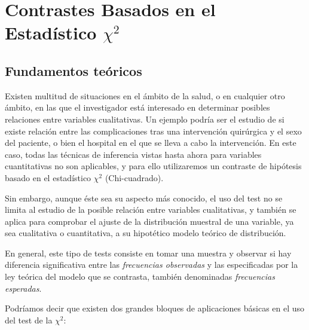
\chapter{Contrastes Basados en el Estadístico $\chi^{2}$}
\section{Fundamentos teóricos}
Existen multitud de situaciones en el ámbito de la salud, o en 
cualquier otro ámbito, en las que el investigador está interesado en determinar posibles relaciones entre variables cualitativas. Un ejemplo podría ser el estudio de si existe relación entre las complicaciones tras una intervención quirúrgica y el
 sexo del paciente, o bien el hospital en el que se lleva a cabo 
la intervención.
En este caso, todas las técnicas de inferencia vistas hasta ahora para variables cuantitativas no son aplicables, y para ello utilizaremos un contraste de hipótesis basado en el estadístico $\chi^{2}$ (Chi-cuadrado).

Sin embargo, aunque éste sea su aspecto
 más conocido, el uso del test no se limita al estudio de la 
posible relación entre variables cualitativas, y también se aplica para comprobar el ajuste de la distribución muestral de una
 variable, ya sea cualitativa o cuantitativa, a su hipotético
modelo teórico de distribución.

En general, este tipo de tests consiste en tomar una muestra y
observar si hay diferencia significativa entre las \emph{frecuencias
observadas} y las especificadas por la ley teórica del modelo que
se contrasta, también denominadas \emph{frecuencias esperadas}.

Podríamos decir que existen dos grandes bloques de aplicaciones
básicas en el uso del test de la $\chi^{2}$:

